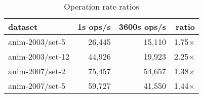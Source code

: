 \begin{table}
\begin{center}
\begin{tabular}{|l|r|r|r|}
\hline
dataset & 1s ops/s & 3600s ops/s & ratio \\
\hline
anim-2003/set-5  & 26,445 & 15,110 & 1.75$\times$ \\
anim-2003/set-12 & 44,926 & 19,923 & 2.25$\times$ \\
anim-2007/set-2  & 75,457 & 54,657 & 1.38$\times$ \\
anim-2007/set-5  & 59,727 & 41,550 & 1.44$\times$ \\
\hline
\end{tabular}
\end{center}
\vspace{-0.1in}
\caption{Operation rate ratios}
\label{table:99quant-differences}
\end{table}

